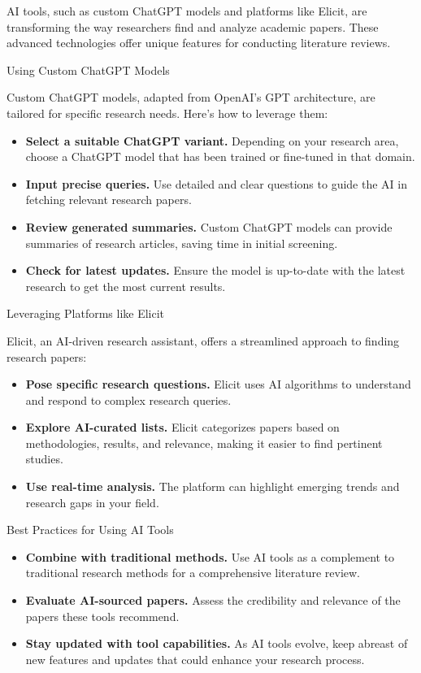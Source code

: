 \documentclass[
]{book}
\begin{document}
AI tools, such as custom ChatGPT models and platforms like Elicit, are transforming the way researchers find and analyze academic papers. These advanced technologies offer unique features for conducting literature reviews.

Using Custom ChatGPT Models

Custom ChatGPT models, adapted from OpenAI's GPT architecture, are tailored for specific research needs. Here's how to leverage them:

\begin{itemize}
\item
  \textbf{Select a suitable ChatGPT variant.} Depending on your research area, choose a ChatGPT model that has been trained or fine-tuned in that domain.
\item
  \textbf{Input precise queries.} Use detailed and clear questions to guide the AI in fetching relevant research papers.
\item
  \textbf{Review generated summaries.} Custom ChatGPT models can provide summaries of research articles, saving time in initial screening.
\item
  \textbf{Check for latest updates.} Ensure the model is up-to-date with the latest research to get the most current results.
\end{itemize}

Leveraging Platforms like Elicit

Elicit, an AI-driven research assistant, offers a streamlined approach to finding research papers:

\begin{itemize}
\item
  \textbf{Pose specific research questions.} Elicit uses AI algorithms to understand and respond to complex research queries.
\item
  \textbf{Explore AI-curated lists.} Elicit categorizes papers based on methodologies, results, and relevance, making it easier to find pertinent studies.
\item
  \textbf{Use real-time analysis.} The platform can highlight emerging trends and research gaps in your field.
\end{itemize}

Best Practices for Using AI Tools

\begin{itemize}
\item
  \textbf{Combine with traditional methods.} Use AI tools as a complement to traditional research methods for a comprehensive literature review.
\item
  \textbf{Evaluate AI-sourced papers.} Assess the credibility and relevance of the papers these tools recommend.
\item
  \textbf{Stay updated with tool capabilities.} As AI tools evolve, keep abreast of new features and updates that could enhance your research process.
\end{itemize}
\end{document}
